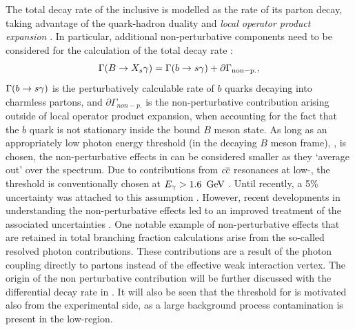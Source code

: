 The total decay rate of the inclusive \BtoXsgamma is modelled as the rate of its parton decay, 
taking advantage of the quark-hadron duality and \textit{local operator product expansion} \cite{Peskin:1995ev,Buchalla:1995vs,Buras:1998raa}.
In particular, additional non-perturbative components need to be considered for the \SM calculation of the total decay rate \cite{Misiak:2015xwa}:
\begin{equation}\label{eq:btosgammarate_nonp}
    \Gamma(B\rightarrow X_s\gamma) = \Gamma(b\rightarrow s\gamma) + \partial\Gamma_{\mathrm{non-p.}},
\end{equation}
$\Gamma(b\rightarrow s\gamma)$ is the perturbatively calculable rate of $b$ quarks decaying into charmless partons, 
and $\partial\Gamma_{non-p.}$ is the non-perturbative contribution arising outside of local operator product expansion, when accounting for the fact that the $b$ quark is not stationary inside the bound $B$ meson state.
As long as an appropriately low photon energy threshold (in the decaying $B$ meson frame), \EB, is chosen, the non-perturbative effects in  can be considered smaller as they `average out' over the spectrum.
Due to contributions from $c\overline c$ resonances at low-\Egamma, the threshold is conventionally chosen at ${E_{\gamma}}>1.6~\mathrm{\,Ge\kern -0.1em V}$ \cite{Misiak:2009nr}.
Until recently, a 5\% uncertainty was attached to this assumption \cite{Benzke:2010js}. 
However, recent developments in understanding the non-perturbative effects \cite{Gunawardana:2019gep} led to an improved treatment of the associated uncertainties \cite{Misiak:2020vlo}.
One notable example of non-perturbative effects that are retained in total branching fraction calculations arise from the so-called resolved photon contributions.
These contributions are a result of the photon coupling directly to partons instead of the effective weak interaction vertex.
The origin of the non perturbative contribution will be further discussed with the differential decay rate in .
It will also be seen that the threshold for \EB is motivated also from the experimental side, as a large background process contamination is present in the low-\EB region.

